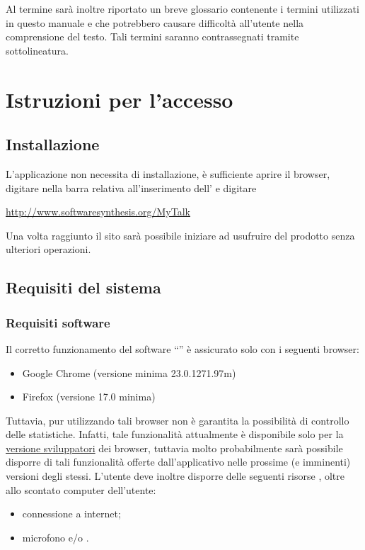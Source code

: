 
Al termine sarà inoltre riportato un breve glossario contenente i termini utilizzati in questo manuale e che potrebbero causare difficoltà all'utente nella comprensione del testo. Tali termini saranno contrassegnati tramite sottolineatura. 

\section{Istruzioni per l'accesso}

\subsection{Installazione}
L'applicazione non necessita di installazione, è sufficiente aprire il browser, digitare nella barra relativa all'inserimento dell'\underline{} e digitare
\begin{center}
 \url{http://www.softwaresynthesis.org/MyTalk}
\end{center}
Una volta raggiunto il sito sarà possibile iniziare ad usufruire del prodotto senza ulteriori operazioni.

\subsection{Requisiti del sistema}
\subsubsection{Requisiti software}
Il corretto funzionamento del software  ``\caName'' è assicurato solo con i seguenti browser:
\begin{itemize}
  \item Google Chrome (versione minima 23.0.1271.97m)
  \item Firefox (versione 17.0 minima)
\end{itemize}

Tuttavia, pur utilizzando tali browser non è garantita la possibilità di controllo delle statistiche. Infatti, tale funzionalità attualmente è disponibile solo per la \underline{versione sviluppatori} dei browser, tuttavia molto probabilmente sarà possibile disporre di tali funzionalità offerte dall'applicativo nelle prossime (e imminenti) versioni degli stessi.
L'utente deve inoltre disporre delle seguenti risorse , oltre allo scontato computer dell'utente:
\begin{itemize}
  \item connessione a internet;
  \item microfono e/o  .
 \end{itemize}

